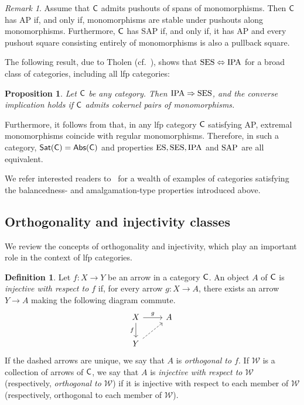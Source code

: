 \documentclass[a4paper,10pt,reqno]{amsart}
\newtheorem{proposition}[theorem]{Proposition}
\theoremstyle{definition}
\newtheorem{definition}[theorem]{Definition}
\theoremstyle{remark}
\newtheorem{remark}[theorem]{Remark}
\newcommand{\cat}{{\sf C}}								%
\newcommand{\Sat}{{\sf Sat}}								%
\newcommand{\Abs}{{\sf Abs}}								%
\newcommand{\ar}[1]{\mathcal{#1}}							%
\newcommand{\IMP}{\Rightarrow}						%
\newcommand{\IFF}{\Leftrightarrow}						%
\newcommand{\ES}{\textnormal{ES}}
\newcommand{\SES}{\textnormal{SES}}
\newcommand{\AP}{\textnormal{AP}}
\newcommand{\IPA}{\textnormal{IPA}}
\newcommand{\SAP}{\textnormal{SAP}}
\begin{document}
\begin{remark}
Assume that $\cat$ admits pushouts of spans of monomorphisms. Then $\cat$ has AP if, and only if, monomorphisms are stable under pushouts along monomorphisms. Furthermore, $\cat$ has SAP if, and only if, it has AP and every pushout square consisting entirely of monomorphisms is also a pullback square.
\end{remark}

The following result, due to Tholen (cf.\ \cite[Proposition~1 and Theorem~1]{Tholen1982}), shows that $\SES\IFF\IPA$ for a broad class of categories, including all lfp categories:
%
\begin{proposition}\label{l:IPA-iff-SES}
Let $\cat$ be any category. Then $\IPA\IMP \SES$, and the converse implication holds if $\cat$ admits cokernel pairs of monomorphisms.
\end{proposition}


Furthermore, it follows from \cite[Proposition~2 and Theorem~2]{Tholen1982} that, in any lfp category $\cat$ satisfying \AP, extremal monomorphisms coincide with regular monomorphisms. Therefore, in such a category, $\Sat(\cat)=\Abs(\cat)$ and properties $\ES,\SES,\IPA$ and $\SAP$ are all equivalent.

We refer interested readers to~\cite{KMPT1983} for a wealth of examples of categories satisfying the balancedness- and amalgamation-type properties introduced above.


\subsection{Orthogonality and injectivity classes}

We review the concepts of orthogonality and injectivity, which play an important role in the context of lfp categories.

\begin{definition}\label{d:orthogonal}
Let $f\colon X\to Y$ be an arrow in a category $\cat$. An object $A$ of $\cat$ is \emph{injective with respect to $f$} if, for every arrow $g\colon X\to A$, there exists an arrow $Y\to A$ making the following diagram commute.
%
\[\begin{tikzcd}
X \arrow{d}[swap]{f} \arrow{r}{g} & A \\
Y \arrow[dashed]{ur} &
\end{tikzcd}\]
%
If the dashed arrows are unique, we say that $A$ is \emph{orthogonal to $f$}.
If $\ar{W}$ is a collection of arrows of $\cat$, we say that $A$ is \emph{injective with respect to $\ar{W}$} (respectively, \emph{orthogonal to $\ar{W}$}) if it is injective with respect to each member of $\ar{W}$ (respectively, orthogonal to each member of $\ar{W}$).
\end{definition}
\end{document}
